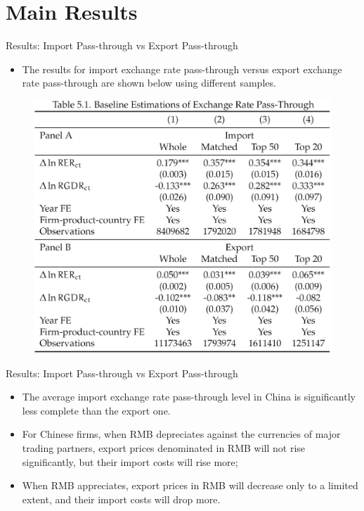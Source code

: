 \documentclass[10pt]{beamer}
\begin{document}
\section{Main Results}

\begin{frame}{Results: Import Pass-through vs Export Pass-through}
	\begin{itemize}
		\item The results for import exchange rate pass-through versus export exchange rate pass-through are shown below using different samples.
	\end{itemize}
	\begin{figure}[htbp]
		\centering
		\includegraphics[width=0.7\columnwidth]{Table5.1.jpg}
		\label{tab5.1}
	\end{figure}
\end{frame}

\begin{frame}{Results: Import Pass-through vs Export Pass-through}
	\begin{tcolorbox}[colback=blue!5!white, colframe=blue!75!black,title=Key Finding 1]
		\begin{itemize}
			\item The average import exchange rate pass-through level in China is significantly less complete than the export one.
		\end{itemize}
	\end{tcolorbox}
	\begin{itemize}
		\item For Chinese firms, when RMB depreciates against the currencies of major trading partners, export prices denominated in RMB will not rise significantly, but their import costs will rise more; 
		\item When RMB appreciates, export prices in RMB will decrease only to a limited extent, and their import costs will drop more.
	\end{itemize}
\end{frame}
\end{document}

